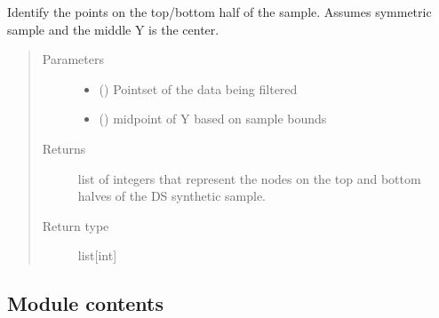 \documentclass[letterpaper,10pt,english]{sphinxmanual}
\begin{document}

\begin{fulllineitems}
\label{\detokenize{openfdem:openfdem.rotary_ds_thread_pool_generators.sub_filter}}
Identify the points on the top/bottom half of the sample. Assumes symmetric sample and the middle Y is the center.
\begin{quote}\begin{description}
\item[{Parameters}] \leavevmode\begin{itemize}
\item {} 
 () \textendash{} Pointset of the data being filtered

\item {} 
 () \textendash{} mid\sphinxhyphen{}point of Y based on sample bounds

\end{itemize}

\item[{Returns}] \leavevmode
list of integers that represent the nodes on the top and bottom halves of the DS synthetic sample.

\item[{Return type}] \leavevmode
list{[}int{]}

\end{description}\end{quote}

\end{fulllineitems}



\subsection{Module contents}
\label{\detokenize{openfdem:module-openfdem}}\label{\detokenize{openfdem:module-contents}}
\end{document}
